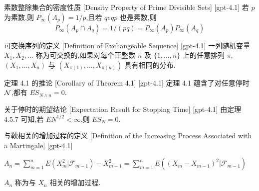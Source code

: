 \documentclass[UTF8]{ctexart}
\begin{document}
    
    
    \begin{ppt}
        {素数整除集合的密度性质}
        [Density Property of Prime Divisible Sets]
        [gpt-4.1]
        若 $p$ 为素数,则 $P_{\infty}(A_{p}) = 1/p$,且若 $q 
eq p$ 也是素数,则
\[
P_{\infty}(A_{p} \cap A_{q}) = 1/(pq) = P_{\infty}(A_{p}) P_{\infty}(A_{q})
\]

    \end{ppt}
    
    
    
    \begin{dfn}
        {可交换序列的定义}
        [Definition of Exchangeable Sequence]
        [gpt-4.1]
        一列随机变量 $X _ { 1 } , X _ { 2 } , \dots$ 称为可交换的,如果对每个正整数 $n$ 及 $\{ 1 , \ldots , n \}$ 上的任意排列 $\pi$,$( X _ { 1 } , \ldots , X _ { n } )$ 与 $( X _ { \pi ( 1 ) } , \ldots , X _ { \pi ( n ) } )$ 具有相同的分布.
    \end{dfn}
    
    
    
    \begin{thm}
        {定理 4.1 的推论}
        [Corollary of Theorem 4.1]
        [gpt-4.1]
        定理 4.1 蕴含了对任意停时 ${\cal N}$,都有 $E S_{N \wedge n} = 0$.
    \end{thm}
    
    
    
    \begin{thm}
        {关于停时的期望结论}
        [Expectation Result for Stopping Time]
        [gpt-4.1]
        由定理 4.5.7 可知,若 $E N^{1/2} < \infty$,则 $E S_N = 0$.
    \end{thm}
    
    
    
    \begin{dfn}
        {与鞅相关的增加过程的定义}
        [Definition of the Increasing Process Associated with a Martingale]
        [gpt-4.1]
        
$A _ { n } = \sum _ { m = 1 } ^ { n } E ( X _ { m } ^ { 2 } | \mathcal { F } _ { m - 1 } ) - X _ { m - 1 } ^ { 2 } = \sum _ { m = 1 } ^ { n } E ( ( X _ { m } - X _ { m - 1 } ) ^ { 2 } | \mathcal { F } _ { m - 1 } )$

$A _ { n }$ 称为与 $X _ { n }$ 相关的增加过程.

    \end{dfn}
    
\end{document}
